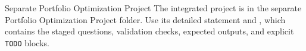 \documentclass[10pt]{article}
\begin{document}
\begin{deliverablebox}{Separate Portfolio Optimization Project}
The integrated project is in the separate Portfolio Optimization Project
folder. Use its detailed statement and ,
which contains the staged questions, validation checks, expected outputs, and
explicit \texttt{TODO} blocks.
\end{deliverablebox}
\end{document}

